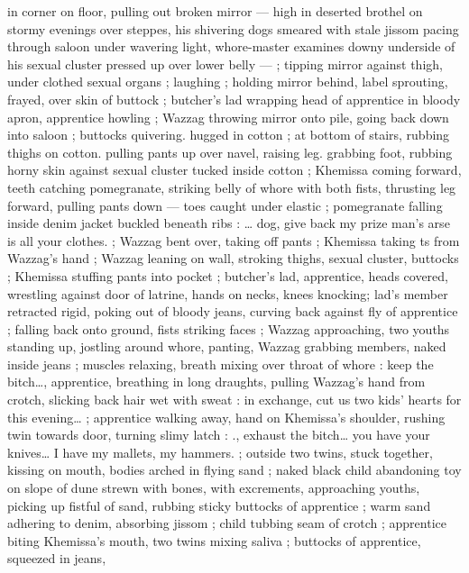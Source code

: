 in corner on floor, pulling out broken mirror --- high in deserted 
brothel on stormy evenings over steppes, his shivering dogs 
smeared with stale jissom pacing through saloon under wavering 
light, whore-master examines downy underside of his sexual cluster 
pressed up over lower belly --- ; tipping mirror against thigh, under 
clothed sexual organs ; laughing ; holding mirror behind, label 
sprouting, frayed, over skin of buttock ; butcher's lad wrapping head 
of apprentice in bloody apron, apprentice howling ; Wazzag throwing 
mirror onto pile, going back down into saloon ; buttocks quivering. 
hugged in cotton ; at bottom of stairs, rubbing thighs on cotton. 
pulling pants up over navel, raising leg. grabbing foot, rubbing horny 
skin against sexual cluster tucked inside cotton ; Khemissa coming 
forward, teeth catching pomegranate, striking belly of whore with 
both fists, thrusting leg forward, pulling pants down --- toes caught 
under elastic ; pomegranate falling inside denim jacket buckled 
beneath ribs : {\gl}{\ldots} dog, give back my prize{\td} man's arse is all your 
clothes.{\gr} ; Wazzag bent over, taking off pants ; Khemissa taking 
ts from Wazzag's hand ; Wazzag leaning on wall, stroking thighs, 
sexual cluster, buttocks ; Khemissa stuffing pants into pocket ; 
butcher's lad, apprentice, heads covered, wrestling against door of 
latrine, hands on necks, knees knocking; lad's member retracted 
rigid, poking out of bloody jeans, curving back against fly of 
apprentice ; falling back onto ground, fists striking faces ; Wazzag 
approaching, two youths standing up, jostling around whore, panting, 
Wazzag grabbing members, naked inside jeans ; muscles relaxing, 
breath mixing over throat of whore : {\gl} keep the bitch{\ldots}{\gr}, apprentice, 
breathing in long draughts, pulling Wazzag's hand from crotch, 
slicking back hair wet with sweat : {\gl}{\td} in exchange, cut us two kids' 
hearts for this evening{\ldots}{\gr} ; apprentice walking away, hand on 
Khemissa's shoulder, rushing twin towards door, turning slimy latch : 
{\gl}., exhaust the bitch{\ldots} you have your knives{\ldots} I have my mallets, my 
hammers.{\gr} ; outside {\td} two twins, stuck together, kissing on mouth, 
bodies arched in flying sand ; naked black child abandoning toy on 
slope of dune strewn with bones, with excrements, approaching 
youths, picking up fistful of sand, rubbing sticky buttocks of 
apprentice ; warm sand adhering to denim, absorbing jissom ; child 
tubbing seam of crotch ; apprentice biting Khemissa's mouth, two 
twins mixing saliva ; buttocks of apprentice, squeezed in jeans, 
